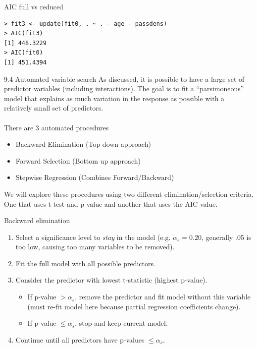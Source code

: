 \documentclass{beamer}
\begin{document}
\begin{frame}[fragile]{AIC full vs reduced}
\begin{verbatim}
> fit3 <- update(fit0, . ~ . - age - passdens)
> AIC(fit3)
[1] 448.3229
> AIC(fit0)
[1] 451.4394    
\end{verbatim}
\end{frame}

\begin{frame}{9.4 Automated variable search}
As discussed, it is possible to have a large set of predictor variables (including
interactions). The goal is to fit a ``parsimoneous'' model that explains as
much variation in the response as possible with a relatively small set of
predictors.\\~\\

\pause There are 3 automated procedures
\begin{itemize}
    \item\pause Backward Elimination (Top down approach)
    \item\pause Forward Selection (Bottom up approach)
    \item\pause Stepwise Regression (Combines Forward/Backward)
\end{itemize}

\pause We will explore these procedures using two different elimination/selection
criteria. \pause One that uses t-test and p-value and another that uses the AIC
value.
\end{frame}

\begin{frame}{Backward elimination}
\begin{enumerate}
\item Select a significance level to \textit{stay} in the model (e.g. $\alpha_s = 0.20$, generally
.05 is too low, causing too many variables to be removed).
\item\pause Fit the full model with all possible predictors.
\item\pause Consider the predictor with lowest t-statistic (highest p-value).
\begin{itemize}
    \item\pause If p-value $> \alpha_s$, remove the predictor and fit model without this
variable (must re-fit model here because partial regression coefficients change). 
    \item\pause If p-value $\le \alpha_s$, stop and keep current model.
\end{itemize}
\item\pause Continue until all predictors have p-values $\le\alpha_s$.    
\end{enumerate}
\end{frame}
\end{document}
